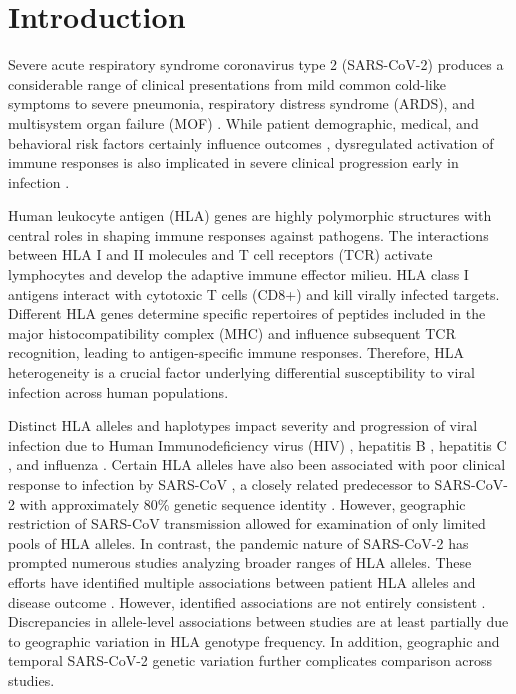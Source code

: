 \documentclass[utf8]{frontiersinFPHY_FAMS} %
\begin{document}
\section{Introduction}

Severe acute respiratory syndrome coronavirus type 2 (SARS-CoV-2) produces a considerable range of clinical presentations from mild common cold-like symptoms to severe pneumonia, respiratory distress syndrome (ARDS), and multisystem organ failure (MOF) \citep{32064853, 32134116}. While patient demographic, medical, and behavioral risk factors certainly influence outcomes \citep{32335169}, dysregulated activation of immune responses is also implicated in severe clinical progression early in infection \citep{31986264, 32085846}.

Human leukocyte antigen (HLA) genes are highly polymorphic structures with central roles in shaping immune responses against pathogens. The interactions between HLA I and II molecules and T cell receptors (TCR) activate lymphocytes and develop the adaptive immune effector milieu. HLA class I antigens interact with cytotoxic T cells (CD8+) and kill virally infected targets. Different HLA genes determine specific repertoires of peptides included in the major histocompatibility complex (MHC) and influence subsequent TCR recognition, leading to antigen-specific immune responses. Therefore, HLA heterogeneity is a crucial factor underlying differential susceptibility to viral infection across human populations.  

Distinct HLA alleles and haplotypes impact severity and progression of viral infection due to Human Immunodeficiency virus (HIV) \citep{22999948, 10073943, 12352262, 21051598}, hepatitis B \citep{27243039, 24842861}, hepatitis C \citep{16571411, 16343061, 18074415}, and influenza \citep{19234171, 11836437, 29315655}. Certain HLA alleles have also been associated with poor clinical response to infection by SARS-CoV \citep{12969506, 32297958}, a closely related predecessor to SARS-CoV-2 with approximately 80\% genetic sequence identity \citep{32027036, 32007145}. However, geographic restriction of SARS-CoV transmission allowed for examination of only limited pools of HLA alleles. In contrast, the pandemic nature of SARS-CoV-2 has prompted numerous studies analyzing broader ranges of HLA alleles. These efforts have identified multiple associations between patient HLA alleles and disease outcome \citep{34490415, 33968060, 33734601, 33298875, 33896121, 34294460, 35960731, 37468623, 37112884, 36627290, 36534127}. However,  identified associations are not entirely consistent \cite{36534127, 38251811}. Discrepancies in allele-level associations between studies are at least partially due to geographic variation in HLA genotype frequency. In addition, geographic and temporal SARS-CoV-2 genetic variation further complicates comparison across studies.  
\end{document}
